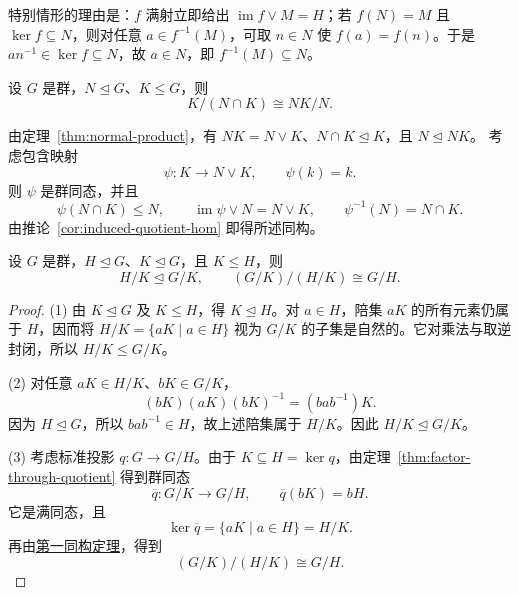 \begin{purplenote}
特别情形的理由是：$f$ 满射立即给出 $\operatorname{im}f\vee M=H$；若 $f(N)=M$ 且 $\ker f\subseteq N$，则对任意 $a\in f^{-1}(M)$，可取 $n\in N$ 使 $f(a)=f(n)$。于是 $an^{-1}\in\ker f\subseteq N$，故 $a\in N$，即 $f^{-1}(M)\subseteq N$。
\end{purplenote}

\begin{corollary}[第二同构定理]\label{cor:second-isomorphism}
设 $G$ 是群，$N\trianglelefteq G$、$K\leq G$，则
\[
  K/(N\cap K)\cong NK/N.
\]
\end{corollary}

\begin{purpleproof}
由定理~\ref{thm:normal-product}，有 $NK=N\vee K$、$N\cap K\trianglelefteq K$，且 $N\trianglelefteq NK$。
考虑包含映射
\[
  \psi:K\longrightarrow N\vee K,\qquad\psi(k)=k.
\]
则 $\psi$ 是群同态，并且
\[
  \psi(N\cap K)\leq N,\qquad
  \operatorname{im}\psi\vee N=N\vee K,\qquad
  \psi^{-1}(N)=N\cap K.
\]
由推论~\ref{cor:induced-quotient-hom} 即得所述同构。
\end{purpleproof}

\begin{corollary}[第三同构定理]\label{cor:third-isomorphism}
设 $G$ 是群，$H\trianglelefteq G$、$K\trianglelefteq G$，且 $K\leq H$，则
\[
  H/K\trianglelefteq G/K,
  \qquad (G/K)/(H/K)\cong G/H.
\]
\end{corollary}

\begin{proof}
(1) 由 $K\trianglelefteq G$ 及 $K\leq H$，得 $K\trianglelefteq H$。对 $a\in H$，陪集 $aK$ 的所有元素仍属于 $H$，因而将 $H/K=\{aK\mid a\in H\}$ 视为 $G/K$ 的子集是自然的。它对乘法与取逆封闭，所以 $H/K\leq G/K$。

(2) 对任意 $aK\in H/K$、$bK\in G/K$，
\[
  (bK)(aK)(bK)^{-1}=(bab^{-1})K.
\]
因为 $H\trianglelefteq G$，所以 $bab^{-1}\in H$，故上述陪集属于 $H/K$。因此 $H/K\trianglelefteq G/K$。

(3) 考虑标准投影 $q:G\to G/H$。由于 $K\subseteq H=\ker q$，由定理~\ref{thm:factor-through-quotient} 得到群同态
\[
  \overline q:G/K\longrightarrow G/H,
  \qquad\overline q(bK)=bH.
\]
它是满同态，且
\[
  \ker\overline q=\{aK\mid a\in H\}=H/K.
\]
再由\hyperref[cor:first-isomorphism]{第一同构定理}，得到
\[
  (G/K)/(H/K)\cong G/H.
\]
\end{proof}

